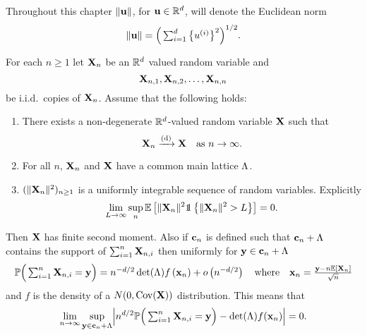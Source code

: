 Throughout this chapter $\lVert{\mathbf u}\rVert$, for ${\mathbf u} \in {\mathbb R}^d$, will denote the Euclidean norm
\begin{equation*}
    \lVert{\mathbf u}\rVert = \Big( \textstyle \sum_{i=1}^d \big\{ u^{(i)} \big\}^2 \Big)^{1/2}.
\end{equation*}

\begin{theorem}
    \label{thm:multi-triangular-llt}
    For each $n \geq 1$ let ${\mathbf X}_n$ be an ${\mathbb R}^d$ valued random variable and
    \begin{equation*}
        {\mathbf X}_{n, 1}, {\mathbf X}_{n, 2}, \ldots, {\mathbf X}_{n, n}  
    \end{equation*}
    be i.i.d.\ copies of ${\mathbf X}_n$. Assume that the following holds:
    \begin{enumerate}
        \item There exists a non-degenerate ${\mathbb R}^d$-valued random variable ${\mathbf X}$ such that
            \begin{equation*}
                {\mathbf X}_n \xrightarrow[]{\mathrm{(d)}} {\mathbf X} \quad \text{as $n \to \infty$.}
            \end{equation*} 
        \item For all $n$, ${\mathbf X}_n$ and ${\mathbf X}$ have a common main lattice $\Lambda$.
        \item $(\lVert{\mathbf X}_n\rVert^2)_{n \geq 1}$ is a uniformly integrable sequence of random variables. Explicitly
            \begin{equation}
                \label{eq:ui-condition}
                \lim_{L \to \infty} \sup_n \E\left[
                    \norm{\vX_n}^2
                    \one \left\{ \norm{\vX_n}^2 > L \right\}
                \right] = 0.
            \end{equation}
    \end{enumerate}
    Then ${\mathbf X}$ has finite second moment. Also if ${\mathbf c}_n$ is defined such that ${\mathbf c}_n + \Lambda$ contains the support of $\sum_{i=1}^n {\mathbf X}_{n, i}$ then uniformly for ${\mathbf y} \in {\mathbf c}_n + \Lambda$
    \begin{equation*}
        {\mathbb P}\Big(
            \textstyle \sum_{i=1}^n {\mathbf X}_{n, i} = {\mathbf y}
        \Big)
        = n^{-d/2} \det(\Lambda) f\left( {\mathbf x}_n \right) + o \left( n^{-d/2} \right)
        \quad \text{where} \quad
        {\mathbf x}_n = \frac{{\mathbf y} - n {\mathbb E}[{\mathbf X}_n]}{\sqrt{n}}
    \end{equation*}
    and $f$ is the density of a $N(0, \operatorname{Cov}({\mathbf X}))$ distribution. This means that
    \begin{equation*}
        \lim_{n \to \infty} \sup_{\vy \in \vc_n + \lattice} \abs*{
            n^{d/2} \P\Big( \textstyle \sum_{i=1}^n \vX_{n, i} = \vy \Big)
            - \det(\lattice) f(\vx_n)
        } = 0.
    \end{equation*}
\end{theorem}


